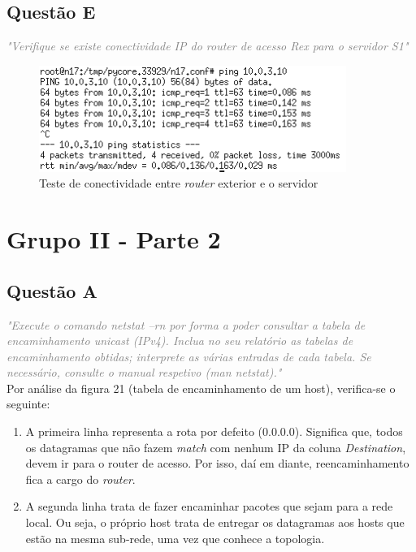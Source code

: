 \documentclass{llncs}
\newcommand{\questionE}[1]{\textcolor{gray}{\textit{"#1"}}}
\begin{document}
\subsection{Questão E}
\hspace{3mm}
\questionE{Verifique se existe conectividade IP do \textit{router} de acesso Rex para o servidor S1}\\

\begin{figure}[H]
\begin{center}
\includegraphics[width=10cm]{PARTEB_1e_routerExteriorTOsv.PNG}
\end{center}
\caption{Teste de conectividade entre \textit{router} exterior e o servidor}
\end{figure}

\clearpage

\section{Grupo II - Parte 2}

\subsection{Questão A}
\hspace{3mm} 
\questionE{Execute o comando netstat –rn por forma a poder consultar a tabela de encaminhamento unicast	(IPv4). Inclua no seu relatório as tabelas de encaminhamento obtidas; interprete as várias entradas de cada tabela. Se necessário, consulte o manual respetivo (man netstat).}\\

Por análise da figura 21 (tabela de encaminhamento de um host), verifica-se o seguinte:

\begin{enumerate}

    \item A primeira linha representa a rota por defeito (0.0.0.0). Significa que, todos os datagramas que não fazem \textit{match} com nenhum IP da coluna \textit{Destination}, devem ir para o router de acesso. Por isso, daí em diante, reencaminhamento fica a cargo do \textit{router}.
    
    \item A segunda linha trata de fazer encaminhar pacotes que sejam para a rede local. Ou seja, o próprio host trata de entregar os datagramas aos hosts que estão na mesma sub-rede, uma vez que conhece a topologia. 

\end{enumerate}
\end{document}
